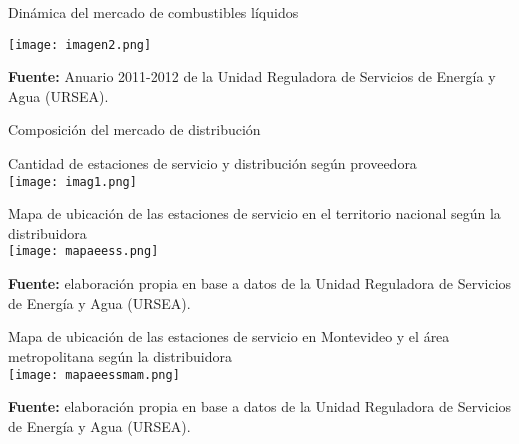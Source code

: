 \documentclass[10pt]{beamer}
\begin{document}
\begin{frame}{Dinámica del mercado de combustibles líquidos}

\begin{center}
\texttt{[image: imagen2.png]}
\end{center}
\FloatBarrier
\noindent\textbf{Fuente:} Anuario 2011-2012 de la Unidad Reguladora de Servicios de Energía y Agua (URSEA).

\end{frame}

\begin{frame}[allowframebreaks]{Composición del mercado de distribución}

\begin{center}
Cantidad de estaciones de servicio y distribución según proveedora \\
\texttt{[image: imag1.png]}
\end{center}

\framebreak

\begin{center}
Mapa de ubicación de las estaciones de servicio en el territorio nacional según la distribuidora \\
\texttt{[image: mapaeess.png]}
\end{center}
\FloatBarrier
\noindent\textbf{Fuente:} elaboración propia en base a datos de la Unidad Reguladora de Servicios de Energía y Agua (URSEA).

\framebreak

\begin{center}
Mapa de ubicación de las estaciones de servicio en Montevideo y el área metropolitana según la distribuidora \\
\texttt{[image: mapaeessmam.png]}
\end{center}
\FloatBarrier
\noindent\textbf{Fuente:} elaboración propia en base a datos de la Unidad Reguladora de Servicios de Energía y Agua (URSEA).

\end{frame}

\end{document}
